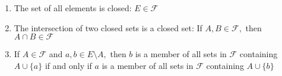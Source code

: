 \begin{enumerate}
  \item The set of all elements is closed: $E \in \mathcal{F}$
  \item The intersection of two closed sets is a closed set: If $A,B \in \mathcal{F},$ then $A \cap B \in \mathcal{F}$
  \item If $A \in \mathcal{F}$ and $a,b \in E \setminus A,$ then $b$ is a member of all sets in $\mathcal{F}$ containing $A \cup \{a\}$ if and only if $a$ is a member of all sets in $\mathcal{F}$ containing $A \cup \{b\}$
\end{enumerate}

